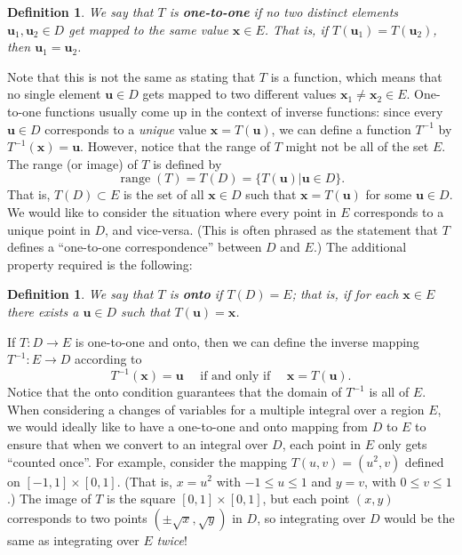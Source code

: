 \documentclass[12pt,letterpaper]{article}
\newtheorem{definition}[theorem]{Definition}
\newcommand{\x}{\mathbf{x}}
\newcommand{\uu}{\mathbf{u}}
\begin{document}
\begin{definition}
We say that $T$ is {\bf one-to-one} if no two distinct elements $\uu_1,\uu_2\in D$ get mapped to the same value $\x\in E$. That is, if $T(\uu_1)=T(\uu_2)$, then $\uu_1=\uu_2$.
\end{definition}
Note that this is not the same as stating that $T$ is a function, which means that no single element $\uu\in D$ gets mapped to two different values $\x_1\neq \x_2\in E$. One-to-one functions usually come up in the context of inverse functions: since every $\uu\in D$ corresponds to a {\em unique} value $\x = T(\uu)$, we can define a function $T^{-1}$ by $T^{-1}(\x) = \uu$. However, notice that the range of $T$ might not be all of the set $E$. The range (or image) of $T$ is defined by
\[
\operatorname{range}(T) = T(D) = \{T(\uu)|\uu\in D\}.
\]
That is, $T(D)\subset E$ is the set of all $\x\in D$ such that $\x=T(\uu)$ for some $\uu\in D$. We would like to consider the situation where every point in $E$ corresponds to a unique point in $D$, and vice-versa. (This is often phrased as the statement that $T$ defines a ``one-to-one correspondence'' between $D$ and $E$.) The additional property required is the following:
\begin{definition}
We say that $T$ is {\bf onto} if $T(D) = E$; that is, if for each $\x\in E$ there exists a $\uu\in D$ such that $T(\uu)=\x$.
\end{definition}
If $T:D\to E$ is one-to-one and onto, then we can define the inverse mapping $T^{-1}:E\to D$ according to
\[
T^{-1}(\x) = \uu \quad\text{ if and only if }\quad \x = T(\uu).
\]
Notice that the onto condition guarantees that the domain of $T^{-1}$ is all of $E$. When considering a changes of variables for a multiple integral over a region $E$, we would ideally like to have a one-to-one and onto mapping from $D$ to $E$ to ensure that when we convert to an integral over $D$, each point in $E$ only gets ``counted once''. For example, consider the mapping $T(u,v)=(u^2,v)$ defined on $[-1,1]\times [0,1]$. (That is, $x=u^2$ with $-1\leq u\leq 1$ and $y=v$, with $0\leq v\leq 1$.) The image of $T$ is the square $[0,1]\times [0,1]$, but each point $(x,y)$ corresponds to two points $(\pm \sqrt{x},\sqrt{y})$ in $D$, so integrating over $D$ would be the same as integrating over $E$ {\em twice}!
\end{document}
